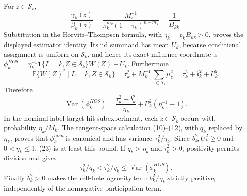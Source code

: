 For \(z\in\mathcal S_k\),
\[
 \frac{\gamma_k(z)}{\beta_k(z)}
 =\frac{M_k^{-1}}{\pi_k^{m_k}(1-\pi_k)^{n-m_k}}=\frac1{B_{kk}}. \tag{22}
\]
Substitution in the Horvitz--Thompson formula, with \(\eta_k=p_kB_{kk}>0\), proves the displayed estimator identity.  Its iid summand has mean \(U_k\), because conditional assignment is uniform on \(\mathcal S_k\), and hence its exact influence coordinate is
\(\phi_k^{HOS}=\eta_k^{-1}\mathbf1\{L=k,Z\in\mathcal S_k\}W(Z)-U_k\).  Furthermore
\[
 \mathbb E\{W(Z)^2\mid L=k,Z\in\mathcal S_k\}
 =\tau_k^2+M_k^{-1}\sum_{z\in\mathcal S_k}\mu_z^2
 =\tau_k^2+b_k^2+U_k^2.
\]
Therefore
\[
 \operatorname{Var}(\phi_k^{HOS})
 =\frac{\tau_k^2+b_k^2}{\eta_k}+U_k^2(\eta_k^{-1}-1). \tag{23}
\]
In the nominal-label target-hit subexperiment, each \(z\in\mathcal S_k\) occurs with probability \(\eta_k/M_k\).  The tangent-space calculation (10)--(12), with \(q_k\) replaced by \(\eta_k\), proves that \(\phi_k^{nom}\) is canonical and has variance \(\tau_k^2/\eta_k\).  Since \(b_k^2,U_k^2\geq0\) and \(0<\eta_k\leq1\), (23) is at least this bound.  If \(q_k>\eta_k\) and \(\tau_k^2>0\), positivity permits division and gives
\[
 \tau_k^2/q_k<\tau_k^2/\eta_k\leq\operatorname{Var}(\phi_k^{HOS}).
\]
Finally \(b_k^2>0\) makes the cell-heterogeneity term \(b_k^2/\eta_k\) strictly positive, independently of the nonnegative participation term.